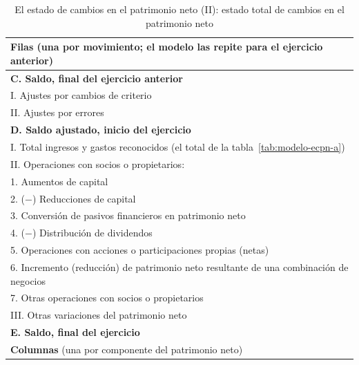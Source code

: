 \documentclass[11pt]{article}
\begin{document}
\begin{table}[H]
\centering
\caption{El estado de cambios en el patrimonio neto (II): estado total de cambios en el patrimonio neto}\label{tab:modelo-ecpn-b}
\footnotesize
\renewcommand{\arraystretch}{1.12}
\begin{tabular}{>{\raggedright\arraybackslash}m{13.6cm}}
\toprule
\rowcolor{tceeazulpalido}\textbf{Filas} (una por movimiento; el modelo las repite para el ejercicio anterior) \\
\midrule
\rowcolor{tceesalvia}\textbf{C. Saldo, final del ejercicio anterior} \\
\hspace*{1em}I. Ajustes por cambios de criterio \\
\hspace*{1em}II. Ajustes por errores \\
\rowcolor{tceesalvia}\textbf{D. Saldo ajustado, inicio del ejercicio} \\
\hspace*{1em}I. Total ingresos y gastos reconocidos (el total de la tabla~\ref{tab:modelo-ecpn-a}) \\
\hspace*{1em}II. Operaciones con socios o propietarios: \\
\hspace*{2em}1. Aumentos de capital \\
\hspace*{2em}2. ($-$) Reducciones de capital \\
\hspace*{2em}3. Conversión de pasivos financieros en patrimonio neto \\
\hspace*{2em}4. ($-$) Distribución de dividendos \\
\hspace*{2em}5. Operaciones con acciones o participaciones propias (netas) \\
\hspace*{2em}6. Incremento (reducción) de patrimonio neto resultante de una combinación de negocios \\
\hspace*{2em}7. Otras operaciones con socios o propietarios \\
\hspace*{1em}III. Otras variaciones del patrimonio neto \\
\rowcolor{tceesalvia}\textbf{E. Saldo, final del ejercicio} \\
\midrule
\rowcolor{tceeazulpalido}\textbf{Columnas} (una por componente del patrimonio neto) \\

\end{tabular}
\end{table}
\end{document}

